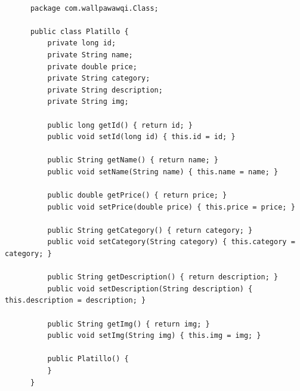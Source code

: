       \begin{listing}[H]
      \centering

      \begin{verbatim}
        
      package com.wallpawawqi.Class;

      public class Platillo {
          private long id;
          private String name;
          private double price;
          private String category;
          private String description;
          private String img;

          public long getId() { return id; }
          public void setId(long id) { this.id = id; }

          public String getName() { return name; }
          public void setName(String name) { this.name = name; }

          public double getPrice() { return price; }
          public void setPrice(double price) { this.price = price; }

          public String getCategory() { return category; }
          public void setCategory(String category) { this.category = category; }

          public String getDescription() { return description; }
          public void setDescription(String description) { this.description = description; }

          public String getImg() { return img; }
          public void setImg(String img) { this.img = img; }

          public Platillo() {
          }
      }

      \end{verbatim}

      \caption{Fragmento del código de la clase Platillo.java utilizado para trabajar con la entidad platillo en el backend del sistema.}
      \label{lst:codigo_modelo9}
      \end{listing}
      